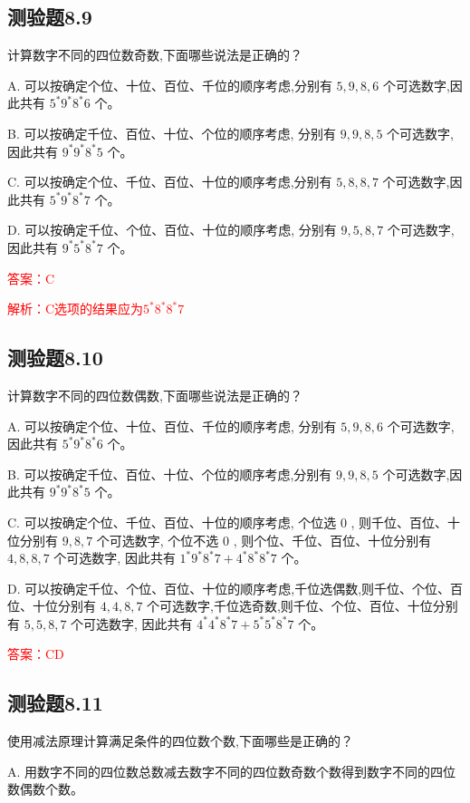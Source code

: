 \documentclass[UTF8, heading=true]{ctexart}
\begin{document}
\subsection{测验题8.9}

计算数字不同的四位数奇数,下面哪些说法是正确的？

A. 可以按确定个位、十位、百位、千位的顺序考虑,分别有 $5,9,8,6$ 个可选数字,因此共有 $5^* 9^* 8^* 6$ 个。

B. 可以按确定千位、百位、十位、个位的顺序考虑, 分别有 $9,9,8,5$ 个可选数字, 因此共有 $9 ^* 9 ^* 8 ^* 5$ 个。

C. 可以按确定个位、千位、百位、十位的顺序考虑,分别有 $5,8,8,7$ 个可选数字,因此共有 $5 ^* 9 ^* 8 ^* 7$ 个。

D. 可以按确定千位、个位、百位、十位的顺序考虑, 分别有 $9,5,8,7$ 个可选数字, 因此共有 $9 ^* 5^* 8^* 7$ 个。

\textcolor{red}{答案：C}

\textcolor{red}{解析：C选项的结果应为$5^* 8 ^* 8 ^* 7$}

\subsection{测验题8.10}

计算数字不同的四位数偶数,下面哪些说法是正确的？

A. 可以按确定个位、十位、百位、千位的顺序考虑, 分别有 $5,9,8,6$ 个可选数字, 因此共有 $5^* 9^* 8^* 6$ 个。

B. 可以按确定千位、百位、十位、个位的顺序考虑,分别有 $9,9,8,5$ 个可选数字,因此共有 $9^* 9^* 8^* 5$ 个。

C. 可以按确定个位、千位、百位、十位的顺序考虑, 个位选 0 , 则千位、百位、十位分别有 $9,8,7$ 个可选数字, 个位不选 0 , 则个位、千位、百位、十位分别有 $4,8,8,7$ 个可选数字, 因此共有 $1 ^* 9^* 8^* 7+4^* 8^* 8^* 7$ 个。

D. 可以按确定千位、个位、百位、十位的顺序考虑,千位选偶数,则千位、个位、百位、十位分别有 $4,4,8,7$ 个可选数字,千位选奇数,则千位、个位、百位、十位分别有 $5,5,8,7$ 个可选数字, 因此共有 $4^* 4^* 8^* 7+5^* 5^* 8^* 7$ 个。

\textcolor{red}{答案：CD}

\subsection{测验题8.11}

使用减法原理计算满足条件的四位数个数,下面哪些是正确的？

A. 用数字不同的四位数总数减去数字不同的四位数奇数个数得到数字不同的四位数偶数个数。
\end{document}
